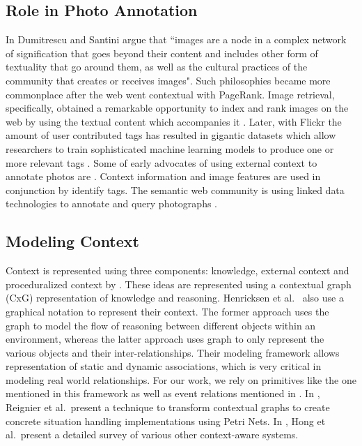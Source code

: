 \subsection{Role in Photo Annotation}
In \cite{dumitrescu2009context} Dumitrescu and Santini argue that ``images are a node in a complex network of signification that goes beyond their content and includes other form of textuality that go around them, as well as the cultural practices of the community that creates or receives images". Such philosophies became more commonplace after the web went contextual with PageRank. Image retrieval, specifically, obtained a remarkable opportunity to index and rank images on the web by using the textual content which accompanies it \cite{chen2001web, frankel1996webseer}. Later, with Flickr the amount of user contributed tags has resulted in gigantic datasets which allow researchers to train sophisticated machine learning models to produce one or more relevant tags \cite{brachmann2013feature, li2013geo, liu2013heterogeneous}. Some of early advocates of using external context to annotate photos are \cite{datta2008image, jain2010content}. Context information and image features are used in conjunction by \cite{o2009context, cao2008annotating, boutell2005beyond, cao2008eventscene} identify tags. The semantic web community is using linked data technologies to annotate and query photographs \cite{monaghan2006automating, nowack2006confoto}. 

\subsection{Modeling Context}
Context is represented using three components: knowledge, external context and proceduralized context by \cite{brezillon2003context}. These ideas are represented using a contextual graph (CxG) representation of knowledge and reasoning. Henricksen et al.\ \cite{henricksen2002modeling} also use a graphical notation to represent their context. The former approach uses the graph to model the flow of reasoning between different objects within an environment, whereas the latter approach uses graph to only represent the various objects and their inter-relationships. Their modeling framework allows representation of static and dynamic associations, which is very critical in modeling real world relationships. For our work, we rely on primitives like the one mentioned in this framework as well as event relations mentioned in \cite{gupta2011managing}. In \cite{reignier2007context}, Reignier et al.\ present a technique to transform contextual graphs to create concrete situation handling implementations using Petri Nets. In \cite{hong2009context}, Hong et al.\ present a detailed survey of various other context-aware systems.

